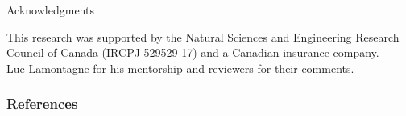 \documentclass[aspectratio=169,10pt,xcolor=x11names,english,french]{beamer}
\begin{document}
	\begin{frame}{Acknowledgments}

		This research was supported by the Natural Sciences and Engineering Research Council of Canada (IRCPJ 529529-17) and a Canadian insurance company. 
		\\
		
		Luc Lamontagne for his mentorship and reviewers for their comments.
	\end{frame}
	
	

	\begin{frame}[t, allowframebreaks]
		\frametitle{References}
		
		
	\end{frame}
	
\end{document}
